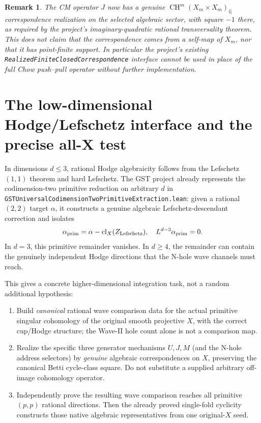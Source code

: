 \documentclass[11pt]{article}
\newtheorem{remark}{Remark}
\newcommand{\QQ}{\mathbb Q}
\newcommand{\CH}{\operatorname{CH}}
\newcommand{\cl}{\operatorname{cl}}
\begin{document}
\begin{remark}
The CM operator \(J\) now has a genuine \(\CH^m(X_m\times X_m)_\QQ\) correspondence realization on the selected algebraic sector, with square \(-1\) there, as required by the project's imaginary-quadratic rational transversality theorem. This does \emph{not} claim that the correspondence comes from a self-map of \(X_m\), nor that it has point-finite support. In particular the project's existing \texttt{RealizedFiniteClosedCorrespondence} interface cannot be used in place of the full Chow push--pull operator without further implementation.
\end{remark}

\section{The low-dimensional Hodge/Lefschetz interface and the precise all-X test}

In dimensions \(d\le3\), rational Hodge algebraicity follows from the Lefschetz \((1,1)\) theorem and hard Lefschetz. The GST project already represents the codimension-two primitive reduction on arbitrary \(d\) in
\texttt{GSTUniversalCodimensionTwoPrimitiveExtraction.lean}: given a rational \((2,2)\) target \(\alpha\), it constructs a genuine algebraic Lefschetz-descendant correction and isolates
\[
 \alpha_{\rm prim}
 =\alpha-\cl_X(Z_{\rm Lefschetz}),\quad
 L^{d-3}\alpha_{\rm prim}=0.
\]
In \(d=3\), this primitive remainder vanishes. In \(d\ge4\), the remainder can contain the genuinely independent Hodge directions that the N-hole wave channels must reach.

This gives a concrete higher-dimensional integration task, not a random additional hypothesis:

\begin{enumerate}
 \item Build \emph{canonical} rational wave comparison data for the actual primitive singular cohomology of the original smooth projective \(X\), with the correct cup/Hodge structure; the Wave-II hole count alone is not a comparison map.
 \item Realize the specific three generator mechanisms \(U,J,M\) (and the N-hole address selectors) by \emph{genuine} algebraic correspondences on \(X\), preserving the canonical Betti cycle-class square. Do not substitute a supplied arbitrary off-image cohomology operator.
 \item Independently prove the resulting wave comparison reaches all primitive \((p,p)\) rational directions. Then the already proved single-fold cyclicity constructs those native algebraic representatives from one original-\(X\) seed.
\end{enumerate}
\end{document}
